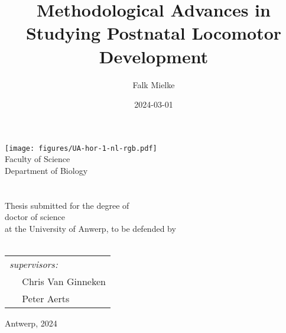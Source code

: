 \documentclass[12pt,a4paper,twoside]{report}
\title{Methodological Advances \linebreak in \linebreak Studying Postnatal Locomotor Development}
\author{Falk Mielke}
\date{2024-03-01}
\begin{document}
\doublespacing
\makeatletter
    \begin{titlepage}  
    \begin{spacing}{2}
        \begin{center}
            {\texttt{[image: figures/UA-hor-1-nl-rgb.pdf]} 
              \\[4ex]}
            {\vspace*{-1.0cm} Faculty of Science \\ \vspace*{-0.4cm} Department of Biology}
            \ \vspace{\fill}\\
            {\LARGE \bfseries  \@title }\\[6ex]
            \ \vspace{1cm}\\
            Thesis submitted for the degree of 
            \\ doctor of science 
            \\ at the University of Anwerp, to be defended by
            {\\\large  \@author}\\[8ex]
        \end{center}
        \vspace*{\fill}
        \begin{flushleft}
            \begin{tabular}{ l}
              \textit{supervisors:}
               \\\(\quad\) Chris Van Ginneken
               \\\(\quad\) Peter Aerts
            \end{tabular}
        \end{flushleft}
        \vspace*{-1.55cm}
        \begin{flushright}
          Antwerp, 2024
        \end{flushright}
        \end{spacing}
    \end{titlepage}
\makeatother
\thispagestyle{empty}
\newpage
\end{document}
